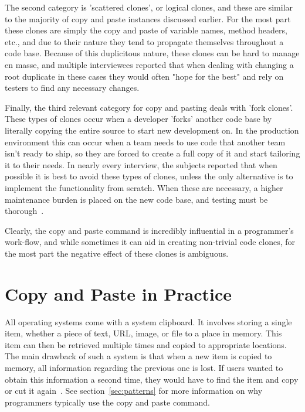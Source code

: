 \documentclass{acm_proc_article-sp}
\begin{document}
The second category is 'scattered clones', or logical clones, and these are similar to the majority of copy and paste instances discussed earlier. For the most part these clones are simply the copy and paste of variable names, method headers, etc., and due to their nature they tend to propagate themselves throughout a code base. Because of this duplicitous nature, these clones can be hard to manage en masse, and multiple interviewees reported that when dealing with changing a root duplicate in these cases they would often "hope for the best" and rely on testers to find any  necessary changes.

Finally, the third relevant category for copy and pasting deals with 'fork clones'. These types of clones occur when a developer 'forks' another code base by literally copying the entire source to start new development on. In the production environment this can occur when a team needs to use code that another team isn't ready to ship, so they are forced to create a full copy of it and start tailoring it to their needs. In nearly every interview, the subjects reported that when possible it is best to avoid these types of clones, unless the only alternative is to implement the functionality from scratch. When these are necessary, a higher maintenance burden is placed on the new code base, and testing must be thorough~\cite{devWorkHabits}.

Clearly, the copy and paste command is incredibly influential in a programmer's work-flow, and while sometimes it can aid in creating non-trivial code clones, for the most part the negative effect of these clones is ambiguous. 

\section{Copy and Paste in Practice}\label{sec:copy}

All operating systems come with a system clipboard. It involves storing a single item, whether a piece of text, URL, image, or file to a place in memory. This item can then be retrieved multiple times and copied to appropriate locations. The main drawback of such a system is that when a new item is copied to memory, all information regarding the previous one is lost. If users wanted to obtain this information a second time, they would have to find the item and copy or cut it again~\cite{codeReuse}. See section~\ref{sec:patterns} for more information on why programmers typically use the copy and paste command.
\end{document}
